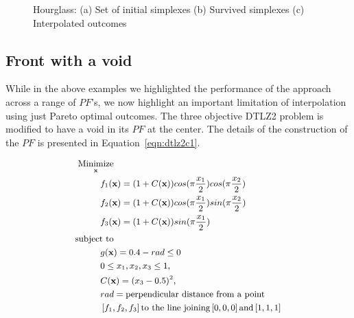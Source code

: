 \begin{figure*}[!ht]
	\centering
	\caption{Hourglass: (a) Set of initial {\color{blue}simplexes} (b) Survived {\color{blue}simplexes} (c) Interpolated outcomes}
	\label{fig:mixed_dtlz2_true_approx}
\end{figure*}

\subsection{Front with a void}
While in the above examples we highlighted the performance of the approach across a range of $PF$'s, we now highlight an important limitation of interpolation using just Pareto optimal outcomes. The three objective DTLZ2 problem is modified to have a void in its $PF$ at the center. The details of the construction of the $PF$ is presented in Equation~\ref{eqn:dtlz2c1}.

\begin{equation}\small
\begin{aligned}
\underset{\textbf{x}}{\operatorname{Minimize}}& \\
& \hspace{-1.5em}f_1(\textbf{x}) = (1+C(\textbf{x}))cos(\pi\frac{x_1}{2})cos(\pi\frac{x_2}{2}) \\
& \hspace{-1.5em}f_2(\textbf{x}) = (1+C(\textbf{x}))cos(\pi\frac{x_1}{2})sin(\pi\frac{x_2}{2}) \\ 
& \hspace{-1.5em}f_3(\textbf{x}) = (1+C(\textbf{x}))sin(\pi\frac{x_1}{2}) \\
\text{subject to}&\\
& \hspace{-1.5em}g(\textbf{x}) = 0.4 - rad \le 0 \\
& \hspace{-1.5em}0 \le x_1, x_2, x_3 \le 1,\\ 
& \hspace{-1.5em}C(\textbf{x}) = (x_3 - 0.5)^2,\\
& \hspace{-1.5em}rad = \text{perpendicular distance from a point}\\ 
& \hspace{-1.5em}\left[f_1, f_2, f_3\right] \text{to the line joining} \left[0, 0, 0\right] \text{and} \left[1, 1, 1\right]
\label{eqn:dtlz2c1}
\end{aligned}
\end{equation} 

